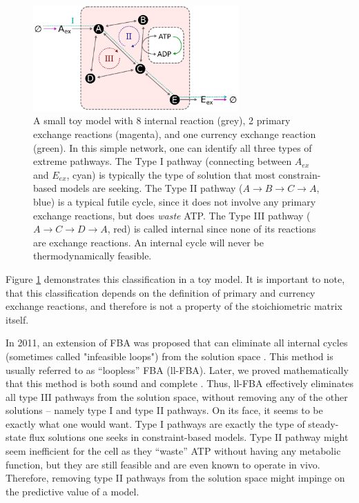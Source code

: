 \documentclass[twocolumn]{bmcart}%
\begin{document}
\begin{figure}[h!]
	\includegraphics[width=3.1in]{figure1.pdf}
	\caption{
		A small toy model with 8 internal reaction (grey), 2 primary exchange reactions (magenta), and one currency exchange reaction (green). In this simple network, one can identify all three types of extreme pathways. The Type I pathway (connecting between $A_{ex}$ and $E_{ex}$, cyan) is typically the type of solution that most constrain-based models are seeking. The Type II pathway ($A \rightarrow B \rightarrow C \rightarrow A$, blue) is a typical futile cycle, since it does not involve any primary exchange reactions, but does \emph{waste} ATP. The Type III pathway ($A \rightarrow C \rightarrow D \rightarrow A$, red) is called internal since none of its reactions are exchange reactions. An internal cycle will never be thermodynamically feasible.}
    \label{fig:cycles}
\end{figure}
Figure \ref{fig:cycles} demonstrates this classification in a toy model. It is important to note, that this classification depends on the definition of primary and currency exchange reactions, and therefore is not a property of the stoichiometric matrix itself.

In 2011, an extension of FBA was proposed that can eliminate all internal cycles (sometimes called "infeasible loops") from the solution space \cite{Schellenberger2011-bq}. This method is usually referred to as ``loopless'' FBA (ll-FBA). Later, we proved mathematically that this method is both sound and complete \cite{Noor2012-qb}. Thus, ll-FBA effectively eliminates all type III pathways from the solution space, without removing any of the other solutions -- namely type I and type II pathways. On its face, it seems to be exactly what one would want. Type I pathways are exactly the type of steady-state flux solutions one seeks in constraint-based models. Type II pathway might seem inefficient for the cell as they ``waste'' ATP without having any metabolic function, but they are still feasible and are even known to operate in vivo. Therefore, removing type II pathways from the solution space might impinge on the predictive value of a model.
\end{document}
